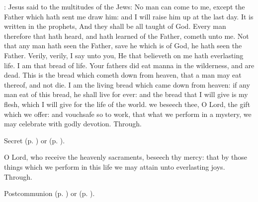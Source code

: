 : Jesus said to the multitudes of the Jews: No man can come to me, except the Father which hath sent me draw him: and I will raise him up at the last day. It is written in the prophets, And they shall be all taught of God. Every man therefore that hath heard, and hath learned of the Father, cometh unto me. Not that any man hath seen the Father, save he which is of God, he hath seen the Father. Verily, verily, I say unto you, He that believeth on me hath everlasting life. I am that bread of life. Your fathers did eat manna in the wilderness, and are dead. This is the bread which cometh down from heaven, that a man may eat thereof, and not die. I am the living bread which came down from heaven: if any man eat of this bread, he shall live for ever: and the bread that I will give is my flesh, which I will give for the life of the world.
\secret
{} we beseech thee, O Lord, the gift which we offer: and vouchsafe so to work, that what we perform in a mystery, we may celebrate with godly devotion. Through.
\begin{rubric}
     Secret  (p. \pageref{SPAgainst}) or  (p. \pageref{SPChiefBishop}).
\end{rubric}
\postcommunion
{} O Lord, who receive the heavenly sacraments, beseech thy mercy: that by those things which we perform in this life we may attain unto everlasting joys. Through.
\begin{rubric}
     Postcommunion  (p. \pageref{SPAgainst}) or  (p. \pageref{SPChiefBishop}).
\end{rubric}

\clearpage
{}
\fancyhead[RE,LO]{}

